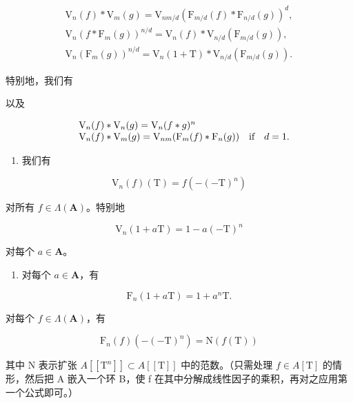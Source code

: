 \[
\begin{array}{l} \mathrm{V} _ {n} (f) * \mathrm{V} _ {m} (g) = \mathrm{V} _ {n m / d} (\mathrm{F} _ {m / d} (f) * \mathrm{F} _ {n / d} (g)) ^ {d}, \\ \mathrm{V} _ {n} (f * \mathrm{F} _ {m} (g)) ^ {n / d} = \mathrm{V} _ {n} (f) * \mathrm{V} _ {n / d} (\mathrm{F} _ {m / d} (g)), \\ \mathrm{V} _ {n} (\mathrm{F} _ {m} (g)) ^ {n / d} = \mathrm{V} _ {n} (1 + \mathrm{T}) * \mathrm{V} _ {n / d} (\mathrm{F} _ {m / d} (g)). \end{array}
\]

特别地，我们有

以及

\[
\begin{array}{r l} & {\mathrm{V} _ {n} (f) * \mathrm{V} _ {n} (g) = \mathrm{V} _ {n} (f * g) ^ {n}} \\ & {\mathrm{V} _ {n} (f) * \mathrm{V} _ {m} (g) = \mathrm{V} _ {n m} (\mathrm{F} _ {m} (f) * \mathrm{F} _ {n} (g)) \quad \text {if} \quad d = 1.} \end{array}
\]

\begin{enumerate}
\def\labelenumi{\alph{enumi})}
\setcounter{enumi}{5}
\tightlist
\item
  我们有
\end{enumerate}

\[
\mathrm{V} _ {n} (f) (\mathrm{T}) = f (- (- \mathrm{T}) ^ {n})
\]

对所有 \(f \in \Lambda(\mathbf{A})\)。特别地

\[
\mathrm{V} _ {n} (1 + a \mathrm{T}) = 1 - a (- \mathrm{T}) ^ {n}
\]

对每个 \(a \in \mathbf{A}\)。

\begin{enumerate}
\def\labelenumi{\alph{enumi})}
\setcounter{enumi}{6}
\tightlist
\item
  对每个 \(a \in \mathbf{A}\)，有
\end{enumerate}

\[
\mathrm{F} _ {n} (1 + a \mathrm{T}) = 1 + a ^ {n} \mathrm{T}.
\]

对每个 \(f \in \Lambda(\mathbf{A})\)，有

\[
\mathrm{F} _ {n} (f) \left(- (- \mathrm{T}) ^ {n}\right) = \mathrm{N} (f (\mathrm{T}))
\]

其中 N 表示扩张 \(A[[\mathrm{T}^{n}]] \subset A[[\mathrm{T}]]\) 中的范数。（只需处理 \(f \in A[\mathrm{T}]\) 的情形，然后把 A 嵌入一个环 B，使 f 在其中分解成线性因子的乘积，再对之应用第一个公式即可。）

